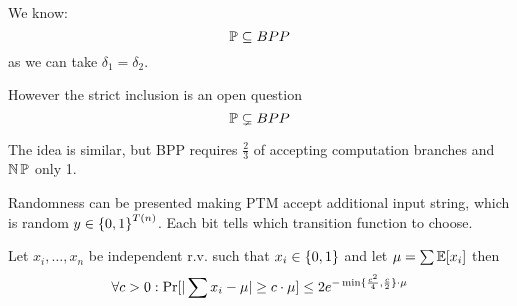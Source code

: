 \begin{note}
	We know:
	\[ \operatorname{\mathbb{P}} \subseteq BPP \]
	as we can take $\delta_1 = \delta_2$.

	However the strict inclusion is an open question
	\[ \operatorname{\mathbb{P}} \subsetneq BPP \]
\end{note}

\begin{note}
	The idea is similar, but BPP requires $\frac{2}{3}$ of accepting computation branches and $\operatorname{\operatorname{\mathbb{N}}\mathbb{P}}$ only 1.
\end{note}

\begin{definition}
	Randomness can be presented making PTM accept additional input string, which is random $y \in \operatorname{\{ 0, 1 \}}^{T(n)}$.
	Each bit tells which transition function to choose.
\end{definition}

\begin{theorem}[Chernoff]\label{chernoff}
	Let $x_i, \ldots, x_n$ be independent r.v. such that $x_i \in \operatorname{\{ 0, 1 \}}$ and let $\mu = \sum \mathbb{E}[x_i]$ then
	\[ \forall c > 0: \operatorname{Pr}[|\sum x_i - \mu| \geq c \cdot \mu ] \leq 2e^{-\min\{ \frac{c^2}{4}, \frac{c}{2} \} \cdot \mu } \]
\end{theorem}

